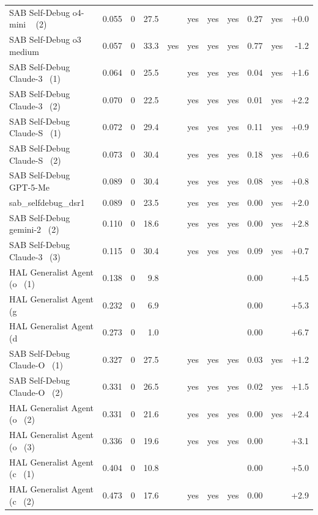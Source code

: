 {\begin{longtable}{lrrrcccccrr}
SAB Self-Debug o4-mini ~ (2) & 0.055 & 0 & 27.5 &  & yes & yes & yes & 0.27 & yes & +0.0 \\
SAB Self-Debug o3 medium & 0.057 & 0 & 33.3 & yes & yes & yes & yes & 0.77 & yes & -1.2 \\
SAB Self-Debug Claude-3~ (1) & 0.064 & 0 & 25.5 &  & yes & yes & yes & 0.04 & yes & +1.6 \\
SAB Self-Debug Claude-3~ (2) & 0.070 & 0 & 22.5 &  & yes & yes & yes & 0.01 & yes & +2.2 \\
SAB Self-Debug Claude-S~ (1) & 0.072 & 0 & 29.4 &  & yes & yes & yes & 0.11 & yes & +0.9 \\
SAB Self-Debug Claude-S~ (2) & 0.073 & 0 & 30.4 &  & yes & yes & yes & 0.18 & yes & +0.6 \\
SAB Self-Debug GPT-5-Me~ & 0.089 & 0 & 30.4 &  & yes & yes & yes & 0.08 & yes & +0.8 \\
sab\_selfdebug\_dsr1 & 0.089 & 0 & 23.5 &  & yes & yes & yes & 0.00 & yes & +2.0 \\
SAB Self-Debug gemini-2~ (2) & 0.110 & 0 & 18.6 &  & yes & yes & yes & 0.00 & yes & +2.8 \\
SAB Self-Debug Claude-3~ (3) & 0.115 & 0 & 30.4 &  & yes & yes & yes & 0.09 & yes & +0.7 \\
HAL Generalist Agent (o~ (1) & 0.138 & 0 & 9.8 &  &  &  &  & 0.00 &  & +4.5 \\
HAL Generalist Agent (g~ & 0.232 & 0 & 6.9 &  &  &  &  & 0.00 &  & +5.3 \\
HAL Generalist Agent (d~ & 0.273 & 0 & 1.0 &  &  &  &  & 0.00 &  & +6.7 \\
SAB Self-Debug Claude-O~ (1) & 0.327 & 0 & 27.5 &  & yes & yes & yes & 0.03 & yes & +1.2 \\
SAB Self-Debug Claude-O~ (2) & 0.331 & 0 & 26.5 &  & yes & yes & yes & 0.02 & yes & +1.5 \\
HAL Generalist Agent (o~ (2) & 0.331 & 0 & 21.6 &  & yes & yes & yes & 0.00 & yes & +2.4 \\
HAL Generalist Agent (o~ (3) & 0.336 & 0 & 19.6 &  & yes & yes & yes & 0.00 &  & +3.1 \\
HAL Generalist Agent (c~ (1) & 0.404 & 0 & 10.8 &  &  &  &  & 0.00 &  & +5.0 \\
HAL Generalist Agent (c~ (2) & 0.473 & 0 & 17.6 &  & yes & yes & yes & 0.00 &  & +2.9 \\
\end{longtable}

}
